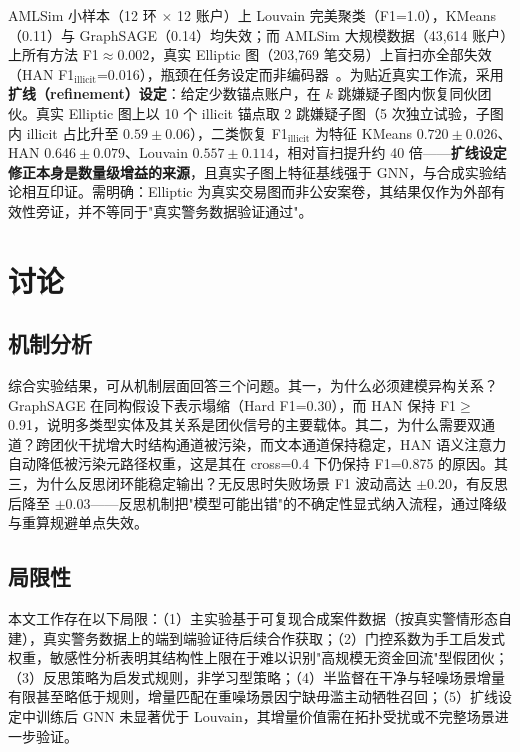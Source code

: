 \documentclass[12pt,a4paper,fontset=windows]{ctexart}
\begin{document}
AMLSim 小样本（12 环 $\times$ 12 账户）上 Louvain 完美聚类（F1=1.0），KMeans（0.11）与 GraphSAGE（0.14）均失效；而 AMLSim 大规模数据（43{,}614 账户）上所有方法 F1$\approx$0.002，真实 Elliptic 图（203{,}769 笔交易）上盲扫亦全部失效（HAN F1$_{\text{illicit}}$=0.016），瓶颈在任务设定而非编码器~\cite{weber2019elliptic}。为贴近真实工作流，采用\textbf{扩线（refinement）设定}：给定少数锚点账户，在 $k$ 跳嫌疑子图内恢复同伙团伙。真实 Elliptic 图上以 10 个 illicit 锚点取 2 跳嫌疑子图（5 次独立试验，子图内 illicit 占比升至 $0.59\pm0.06$），二类恢复 F1$_{\text{illicit}}$ 为特征 KMeans $0.720\pm0.026$、HAN $0.646\pm0.079$、Louvain $0.557\pm0.114$，相对盲扫提升约 40 倍——\textbf{扩线设定修正本身是数量级增益的来源}，且真实子图上特征基线强于 GNN，与合成实验结论相互印证。需明确：Elliptic 为真实交易图而非公安案卷，其结果仅作为外部有效性旁证，并不等同于"真实警务数据验证通过"。

\section{讨论}

\subsection{机制分析}

综合实验结果，可从机制层面回答三个问题。其一，为什么必须建模异构关系？GraphSAGE 在同构假设下表示塌缩（Hard F1=0.30），而 HAN 保持 F1$\ge$0.91，说明多类型实体及其关系是团伙信号的主要载体。其二，为什么需要双通道？跨团伙干扰增大时结构通道被污染，而文本通道保持稳定，HAN 语义注意力自动降低被污染元路径权重，这是其在 cross=0.4 下仍保持 F1=0.875 的原因。其三，为什么反思闭环能稳定输出？无反思时失败场景 F1 波动高达 $\pm$0.20，有反思后降至 $\pm$0.03——反思机制把"模型可能出错"的不确定性显式纳入流程，通过降级与重算规避单点失效。

\subsection{局限性}

本文工作存在以下局限：（1）主实验基于可复现合成案件数据（按真实警情形态自建），真实警务数据上的端到端验证待后续合作获取；（2）门控系数为手工启发式权重，敏感性分析表明其结构性上限在于难以识别"高规模无资金回流"型假团伙；（3）反思策略为启发式规则，非学习型策略；（4）半监督在干净与轻噪场景增量有限甚至略低于规则，增量匹配在重噪场景因宁缺毋滥主动牺牲召回；（5）扩线设定中训练后 GNN 未显著优于 Louvain，其增量价值需在拓扑受扰或不完整场景进一步验证。
\end{document}
